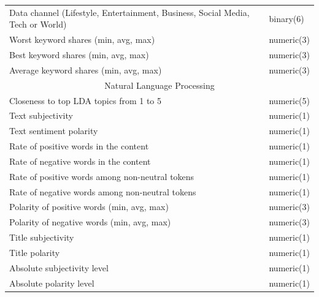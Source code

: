 \documentclass[12pt]{article}
\begin{document}
\begin{table}[h]
\begin{tabular}{ l | l }
            Data channel (Lifestyle, Entertainment, Business, Social Media, Tech or World) & binary(6) \\
            Worst keyword shares (min, avg, max) & numeric(3) \\
            Best keyword shares (min, avg, max) & numeric(3) \\
            Average keyword shares (min, avg, max) & numeric(3) \\
            \hline
            \multicolumn{2}{c}{Natural Language Processing}\\
            \hline
            Closeness to top LDA topics from 1 to 5 & numeric(5) \\
            Text subjectivity & numeric(1) \\
            Text sentiment polarity & numeric(1) \\
            Rate of positive words in the content & numeric(1) \\
            Rate of negative words in the content & numeric(1) \\
            Rate of positive words among non-neutral tokens & numeric(1) \\
            Rate of negative words among non-neutral tokens & numeric(1) \\
            Polarity of positive words (min, avg, max) & numeric(3) \\
            Polarity of negative words (min, avg, max) & numeric(3) \\
            Title subjectivity & numeric(1) \\
            Title polarity & numeric(1) \\
            Absolute subjectivity level & numeric(1) \\
            Absolute polarity level & numeric(1) \\
            \hline\hline
        \end{tabular}
        \label{table:1}
    \end{table}
\clearpage

\doublespacing



\end{document}
